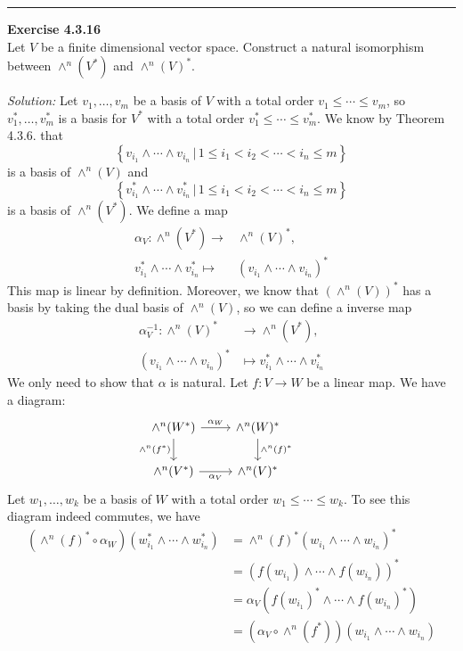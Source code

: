 \documentclass[a4paper, 12pt]{article}
\newenvironment{problem}[2][Exercise]
    { \begin{mdframed}[backgroundcolor=gray!20] \textbf{#1 #2} \\}
    {  \end{mdframed}}
\newenvironment{solution}
    {\textit{Solution:}}
    {}
\begin{document}
\noindent\rule{7in}{2.8pt}

\begin{problem}{4.3.16}
Let \(V\) be a finite dimensional vector space. Construct a natural isomorphism between \(\wedge^n(V^*)\) and \(\wedge^n(V)^*\).
\end{problem}
\begin{solution}
Let \(v_1,\ldots,v_m\) be a basis of \(V\) with a total order \(v_1\leq \cdots\leq v_m\), so \(v_1^*,\ldots,v_m^*\) is a basis for \(V^*\) with a total order \(v_1^*\leq \cdots\leq v_m^*\). We know by Theorem 4.3.6. that 
\[\left\{ v_{i_1}\wedge \cdots\wedge v_{i_n}\,|\, 1\leq i_1< i_2<\cdots<i_n\leq m \right\}\]
is a basis of \(\wedge^n(V)\) and 
\[\left\{ v_{i_1}^*\wedge \cdots\wedge v_{i_n}^*\,|\, 1\leq i_1< i_2<\cdots<i_n\leq m \right\}\]
is a basis of \(\wedge^n(V^*)\). We define a map 
\begin{align*}
	\alpha_V:\wedge^n(V^*) \rightarrow & \wedge^n(V)^*,\\ 
	       v_{i_1}^*\wedge\cdots\wedge v_{i_n}^*\mapsto & (v_{i_1}\wedge\cdots\wedge v_{i_n})^*
\end{align*}
This map is linear by definition. Moreover, we know that \((\wedge^n(V))^*\) has a basis by taking the dual basis of \(\wedge^n(V)\), so we can define a inverse map 
\begin{align*}
	\alpha^{-1}_V:\wedge^n(V)^*&\rightarrow \wedge^n(V^*),\\
	(v_{i_1}\wedge\cdots\wedge v_{i_n})^* &\mapsto v_{i_1}^*\wedge\cdots\wedge v_{i_n}^*
\end{align*}
We only need to show that \(\alpha\) is natural. Let \(f:V\rightarrow W\) be a linear map. We have a diagram:
\[\begin{tikzcd}
	{\wedge^n(W^*)} & {\wedge^n(W)^*} & {} \\
	{\wedge^n(V^*)} & {\wedge^n(V)^*}
	\arrow["{\alpha_W}", from=1-1, to=1-2]
	\arrow["{\wedge^n(f^*)}"', from=1-1, to=2-1]
	\arrow["{\wedge^n(f)^*}", from=1-2, to=2-2]
	\arrow["{\alpha_V}"', from=2-1, to=2-2]
\end{tikzcd}\]
Let \(w_1,\ldots,w_k\) be a basis of \(W\) with a total order \(w_1\leq \cdots\leq w_k\). To see this diagram indeed commutes, we have 
\begin{align*}
	(\wedge^n(f)^*\circ \alpha_W)(w_{i_1}^*\wedge \cdots\wedge w_{i_n}^*) & =\wedge^n(f)^*(w_{i_1}\wedge\cdots\wedge w_{i_n})^*\\ 
	                                                              & =(f(w_{i_1})\wedge\cdots\wedge f(w_{i_n}))^*\\ 
																  & =\alpha_V(f(w_{i_1})^*\wedge\cdots\wedge f(w_{i_n})^*)\\ 
																  & =(\alpha_V\circ \wedge^n(f^*))(w_{i_1}\wedge \cdots\wedge w_{i_n})
\end{align*}
\end{solution}
\end{document}
